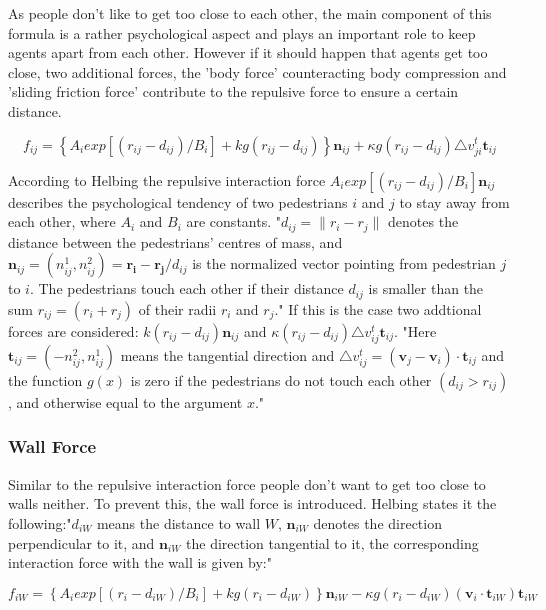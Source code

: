 \documentclass[11pt]{article}
\begin{document}
As people don't like to get too close to each other, the main component of this
formula is a rather psychological aspect and plays an important role to keep
agents apart from each other. However if it should happen that agents get too
close, two additional forces, the 'body force' counteracting body compression
and 'sliding friction force' contribute to the repulsive force to ensure a
certain distance. \cite{SDFEP} 

\begin{equation}
f_{ij}=\left\{A_{i}exp[(r_{ij}-d_{ij})/B_{i}]+kg(r_{ij}-d_{ij})\right\}\mathbf{n}_{ij}+\kappa g(r_{ij}-d_{ij})\triangle v_{ji}^t\mathbf{t}_{ij}
\end{equation}

According to Helbing the repulsive interaction force $A_{i}exp[(r_{ij}-d_{ij})/B_{i}]\mathbf{n}_{ij}$ describes the psychological tendency of two pedestrians $i$ and $j$ to stay away from each other, where $A_i$ and $B_i$ are constants. 
"$d_{ij}=\|r_i-r_j\|$ denotes the distance between the pedestrians' centres of mass, and $\mathbf{n}_{ij}=(n_{ij}^1, n_{ij}^2)=\mathbf{r_i}-\mathbf{r_j}/d_{ij}$ is the normalized vector pointing from pedestrian $j$ to $i$.
The pedestrians touch each other if their distance $d_{ij}$ is smaller than the sum $r_{ij}=(r_i+r_j)$ of their radii $r_i$ and $r_j$."\cite{SDFEP}
If this is the case two addtional forces are considered:
$k(r_{ij}-d_{ij})\mathbf{n}_{ij}$ and $\kappa(r_{ij}-d_{ij})\triangle
v_{ij}^t\mathbf{t}_{ij}$. "Here $\mathbf{t}_{ij}=(-n_{ij}^2,n_{ij}^1)$ means
the tangential direction and $\triangle
v_{ij}^t=(\mathbf{v}_j-\mathbf{v}_i)\cdot\mathbf{t}_{ij}$ and the function
$g(x)$ is zero if the pedestrians do not touch each other $(d_{ij}>r_{ij})$,
and otherwise equal to the argument $x$."\cite{SDFEP}

\subsubsection{Wall Force}
Similar to the repulsive interaction force people don't want to get too close to walls neither. To prevent this, the wall force is introduced.
Helbing states it the following:"$d_{iW}$ means the distance to wall $W$, $\mathbf{n}_{iW}$ denotes  the direction perpendicular to it, and $\mathbf{n}_{iW}$ the direction tangential to it, the corresponding interaction force with the wall is given by:" \cite{SFMPD}

\begin{equation}
f_{iW}=\left\{A_{i}exp[(r_{i}-d_{iW})/B_{i}]+kg(r_{i}-d_{iW})\right\}\mathbf{n}_{iW}-\kappa g(r_{i}-d_{iW})(\mathbf{v}_{i}\cdot\mathbf{t}_{iW})\mathbf{t}_{iW}
\end{equation}
\end{document}
